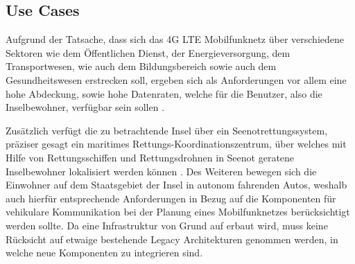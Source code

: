 	\subsection{Use Cases}
\label{subsec:Use Cases}

Aufgrund der Tatsache, dass sich das 4G LTE Mobilfunknetz über verschiedene Sektoren wie dem Öffentlichen Dienst, der Energieversorgung, dem Transportwesen, wie auch dem Bildungsbereich sowie auch dem Gesundheitswesen erstrecken soll, ergeben sich als Anforderungen vor allem eine hohe Abdeckung, sowie hohe Datenraten, welche für die Benutzer, also die Inselbewohner, verfügbar sein sollen \cite{Tch18}. 

Zusätzlich verfügt die zu betrachtende Insel über ein Seenotrettungssystem, präziser gesagt ein maritimes Rettungs-Koordinationszentrum, über welches mit Hilfe von Rettungsschiffen und Rettungsdrohnen in Seenot geratene Inselbewohner lokalisiert werden können \cite{eckermann2018tinylte}. Des Weiteren bewegen sich die Einwohner auf dem Staatsgebiet der Insel in autonom fahrenden Autos, weshalb auch hierfür entsprechende Anforderungen in Bezug auf die Komponenten für vehikulare Kommunikation bei der Planung eines Mobilfunknetzes berücksichtigt werden sollte. Da eine Infrastruktur von Grund auf erbaut wird, muss keine Rücksicht auf etwaige bestehende Legacy Architekturen genommen werden, in welche neue Komponenten zu integrieren sind. 

